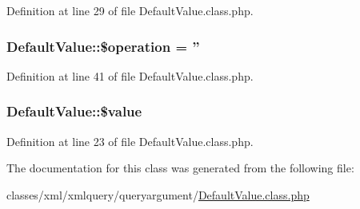 Definition at line 29 of file Default\+Value.\+class.\+php.

\hypertarget{classDefaultValue_a0b0e52103637bbb5ea0fdedcb0672fcd}{
\subsubsection[{\$operation}]{\setlength{\rightskip}{0pt plus 5cm}Default\+Value\+::\$operation = ''}}\label{classDefaultValue_a0b0e52103637bbb5ea0fdedcb0672fcd}


Definition at line 41 of file Default\+Value.\+class.\+php.

\hypertarget{classDefaultValue_a963ea764e6dfb5dbfe87c4b8ffd131ac}{
\subsubsection[{\$value}]{\setlength{\rightskip}{0pt plus 5cm}Default\+Value\+::\$value}}\label{classDefaultValue_a963ea764e6dfb5dbfe87c4b8ffd131ac}


Definition at line 23 of file Default\+Value.\+class.\+php.



The documentation for this class was generated from the following file\+:\begin{DoxyCompactItemize}
\item 
classes/xml/xmlquery/queryargument/\hyperlink{DefaultValue_8class_8php}{Default\+Value.\+class.\+php}\end{DoxyCompactItemize}
